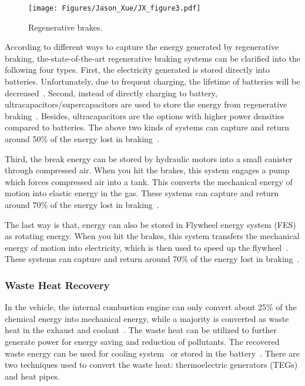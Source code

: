 \begin{figure}
\centering
\texttt{[image: Figures/Jason\_Xue/JX\_figure3.pdf]}
\caption{Regenerative brakes.}
\label{JX_image3}
\end{figure}      

According to different ways to capture the energy generated by regenerative braking, the-state-of-the-art regenerative braking systems can be clarified into the following four types. First, the electricity generated is stored directly into batteries. Unfortunately, due to frequent charging, the lifetime of batteries will be decreased~\cite{JX_12,JX_45}. Second, instead of directly charging to battery, ultracapacitors/supercapacitors are used to store the energy from regenerative braking~\cite{JX_11,JX_31}. Besides, ultracapacitors are the options with higher power densities compared to batteries. The above two kinds of systems can capture and return around 50\% of the energy lost in braking~\cite{JX_48,JX_65}.

Third, the break energy can be stored by hydraulic motors into a small canister through compressed air. When you hit the brakes, this system engages a pump which forces compressed air into a tank. This converts the mechanical energy of motion into elastic energy in the gas. These systems can capture and return around 70\% of the energy lost in braking~\cite{JX_30,JX_58}.

The last way is that, energy can also be stored in Flywheel energy system (FES) as rotating energy. When you hit the brakes, this system transfers the mechanical energy of motion into electricity, which is then used to speed up the flywheel~\cite{JX_16,JX_25,JX_70}. These systems can capture and return around 70\% of the energy lost in braking~\cite{JX_48}.

\subsubsection{Waste Heat Recovery}

In the vehicle, the internal combustion engine can only convert about 25\% of the chemical energy into mechanical energy, while a majority is converted as waste heat in the exhaust and coolant~\cite{JX_37,JX_43,JX_55}. The waste heat can be utilized to further generate power for energy saving and reduction of pollutants. The recovered waste energy can be used for cooling system~\cite{JX_29} or stored in the battery~\cite{JX_71}. There are two techniques used to convert the waste heat: thermoelectric generators (TEGs) and heat pipes.

